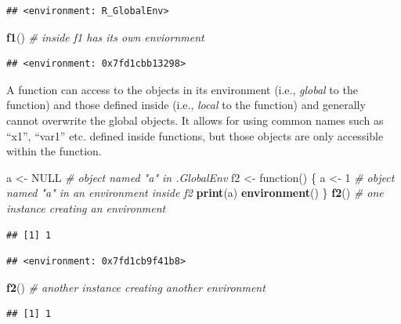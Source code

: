 \documentclass[]{book}
\newenvironment{Shaded}{\begin{snugshade}}{\end{snugshade}}
\newcommand{\KeywordTok}[1]{\textcolor[rgb]{0.13,0.29,0.53}{\textbf{{#1}}}}
\newcommand{\DecValTok}[1]{\textcolor[rgb]{0.00,0.00,0.81}{{#1}}}
\newcommand{\StringTok}[1]{\textcolor[rgb]{0.31,0.60,0.02}{{#1}}}
\newcommand{\CommentTok}[1]{\textcolor[rgb]{0.56,0.35,0.01}{\textit{{#1}}}}
\newcommand{\OtherTok}[1]{\textcolor[rgb]{0.56,0.35,0.01}{{#1}}}
\newcommand{\NormalTok}[1]{{#1}}
\theoremstyle{definition}
\theoremstyle{definition}
\theoremstyle{remark}
\begin{document}
\begin{verbatim}
## <environment: R_GlobalEnv>
\end{verbatim}

\begin{Shaded}
\begin{Highlighting}[]
\KeywordTok{f1}\NormalTok{()  }\CommentTok{# inside f1 has its own enviornment }
\end{Highlighting}
\end{Shaded}

\begin{verbatim}
## <environment: 0x7fd1cbb13298>
\end{verbatim}

A function can access to the objects in its environment (i.e.,
\emph{global} to the function) and those defined inside (i.e.,
\emph{local} to the function) and generally cannot overwrite the global
objects. It allows for using common names such as ``x1'', ``var1'' etc.
defined inside functions, but those objects are only accessible within
the function.

\begin{Shaded}
\begin{Highlighting}[]
\NormalTok{a <-}\StringTok{ }\OtherTok{NULL}  \CommentTok{# object named "a" in .GlobalEnv}
\NormalTok{f2 <-}\StringTok{ }\NormalTok{function() \{}
        \NormalTok{a <-}\StringTok{ }\DecValTok{1}  \CommentTok{# object named "a" in an environment inside f2}
        \KeywordTok{print}\NormalTok{(a)}
        \KeywordTok{environment}\NormalTok{()}
      \NormalTok{\}}
\KeywordTok{f2}\NormalTok{()  }\CommentTok{#  one instance creating an environment   }
\end{Highlighting}
\end{Shaded}

\begin{verbatim}
## [1] 1
\end{verbatim}

\begin{verbatim}
## <environment: 0x7fd1cb9f41b8>
\end{verbatim}

\begin{Shaded}
\begin{Highlighting}[]
\KeywordTok{f2}\NormalTok{()  }\CommentTok{#  another instance creating another environment}
\end{Highlighting}
\end{Shaded}

\begin{verbatim}
## [1] 1
\end{verbatim}
\end{document}
